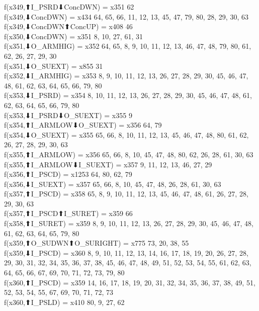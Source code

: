 f(x349,⬆I_PSRD⬇ConcDWN) = x351 {62} \\
f(x349,⬇ConcDWN) = x434 {64, 65, 66, 11, 12, 13, 45, 47, 79, 80, 28, 29, 30, 63} \\
f(x349,⬇ConcDWN⬆ConcUP) = x408 {46} \\
f(x350,⬇ConcDWN) = x351 {8, 10, 27, 61, 31} \\
f(x351,⬇O_ARMHIG) = x352 {64, 65, 8, 9, 10, 11, 12, 13, 46, 47, 48, 79, 80, 61, 62, 26, 27, 29, 30} \\
f(x351,⬇O_SUEXT) = x855 {31} \\
f(x352,⬇I_ARMHIG) = x353 {8, 9, 10, 11, 12, 13, 26, 27, 28, 29, 30, 45, 46, 47, 48, 61, 62, 63, 64, 65, 66, 79, 80} \\
f(x353,⬇I_PSRD) = x354 {8, 10, 11, 12, 13, 26, 27, 28, 29, 30, 45, 46, 47, 48, 61, 62, 63, 64, 65, 66, 79, 80} \\
f(x353,⬇I_PSRD⬇O_SUEXT) = x355 {9} \\
f(x354,⬆I_ARMLOW⬇O_SUEXT) = x356 {64, 79} \\
f(x354,⬇O_SUEXT) = x355 {65, 66, 8, 10, 11, 12, 13, 45, 46, 47, 48, 80, 61, 62, 26, 27, 28, 29, 30, 63} \\
f(x355,⬆I_ARMLOW) = x356 {65, 66, 8, 10, 45, 47, 48, 80, 62, 26, 28, 61, 30, 63} \\
f(x355,⬆I_ARMLOW⬇I_SUEXT) = x357 {9, 11, 12, 13, 46, 27, 29} \\
f(x356,⬆I_PSCD) = x1253 {64, 80, 62, 79} \\
f(x356,⬇I_SUEXT) = x357 {65, 66, 8, 10, 45, 47, 48, 26, 28, 61, 30, 63} \\
f(x357,⬆I_PSCD) = x358 {65, 8, 9, 10, 11, 12, 13, 45, 46, 47, 48, 61, 26, 27, 28, 29, 30, 63} \\
f(x357,⬆I_PSCD⬆I_SURET) = x359 {66} \\
f(x358,⬆I_SURET) = x359 {8, 9, 10, 11, 12, 13, 26, 27, 28, 29, 30, 45, 46, 47, 48, 61, 62, 63, 64, 65, 79, 80} \\
f(x359,⬆O_SUDWN⬆O_SURIGHT) = x775 {73, 20, 38, 55} \\
f(x359,⬇I_PSCD) = x360 {8, 9, 10, 11, 12, 13, 14, 16, 17, 18, 19, 20, 26, 27, 28, 29, 30, 31, 32, 34, 35, 36, 37, 38, 45, 46, 47, 48, 49, 51, 52, 53, 54, 55, 61, 62, 63, 64, 65, 66, 67, 69, 70, 71, 72, 73, 79, 80} \\
f(x360,⬆I_PSCD) = x359 {14, 16, 17, 18, 19, 20, 31, 32, 34, 35, 36, 37, 38, 49, 51, 52, 53, 54, 55, 67, 69, 70, 71, 72, 73} \\
f(x360,⬆I_PSLD) = x410 {80, 9, 27, 62} \\
